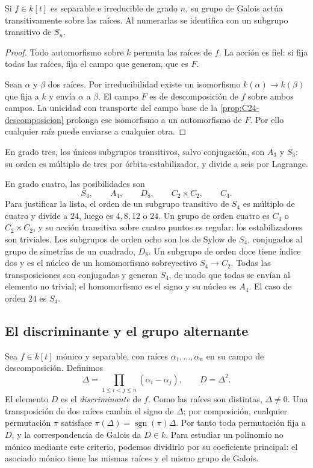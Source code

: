 \begin{lema}\label{lema:C27-transitiva}
Si $f\in k[t]$ es separable e irreducible de grado $n$, su grupo de Galois actúa transitivamente sobre las raíces. Al numerarlas se identifica con un subgrupo transitivo de $S_n$.
\end{lema}
\begin{proof}
Todo automorfismo sobre $k$ permuta las raíces de $f$. La acción es fiel: si fija todas las raíces, fija el campo que generan, que es $F$.

Sean $\alpha$ y $\beta$ dos raíces. Por irreducibilidad existe un isomorfismo $k(\alpha)\to k(\beta)$ que fija a $k$ y envía $\alpha$ a $\beta$. El campo $F$ es de descomposición de $f$ sobre ambos campos. La unicidad con transporte del campo base de la \cref{prop:C24-descomposicion} prolonga ese isomorfismo a un automorfismo de $F$. Por ello cualquier raíz puede enviarse a cualquier otra.
\end{proof}

En grado tres, los únicos subgrupos transitivos, salvo conjugación, son $A_3$ y $S_3$: su orden es múltiplo de tres por órbita-estabilizador, y divide a seis por Lagrange.

En grado cuatro, las posibilidades son
\[
S_4,\qquad A_4,\qquad D_8,\qquad C_2\times C_2,\qquad C_4.
\]
Para justificar la lista, el orden de un subgrupo transitivo de $S_4$ es múltiplo de cuatro y divide a $24$, luego es $4,8,12$ o $24$. Un grupo de orden cuatro es $C_4$ o $C_2\times C_2$, y su acción transitiva sobre cuatro puntos es regular: los estabilizadores son triviales. Los subgrupos de orden ocho son los de Sylow de $S_4$, conjugados al grupo de simetrías de un cuadrado, $D_8$. Un subgrupo de orden doce tiene índice dos y es el núcleo de un homomorfismo sobreyectivo $S_4\to C_2$. Todas las transposiciones son conjugadas y generan $S_4$, de modo que todas se envían al elemento no trivial; el homomorfismo es el signo y su núcleo es $A_4$. El caso de orden $24$ es $S_4$.

\subsection{El discriminante y el grupo alternante}
Sea $f\in k[t]$ mónico y separable, con raíces $\alpha_1,\ldots,\alpha_n$ en su campo de descomposición. Definimos
\[
\Delta=\prod_{1\leq i<j\leq n}(\alpha_i-\alpha_j),
\qquad D=\Delta^2.
\]
El elemento $D$ es el \emph{discriminante} de $f$. Como las raíces son distintas, $\Delta\ne0$. Una transposición de dos raíces cambia el signo de $\Delta$; por composición, cualquier permutación $\pi$ satisface $\pi(\Delta)=\operatorname{sgn}(\pi)\Delta$. Por tanto toda permutación fija a $D$, y la correspondencia de Galois da $D\in k$. Para estudiar un polinomio no mónico mediante este criterio, podemos dividirlo por su coeficiente principal: el asociado mónico tiene las mismas raíces y el mismo grupo de Galois.

